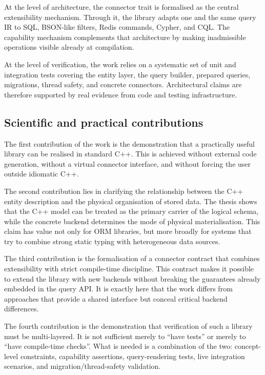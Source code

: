 At the level of architecture, the connector trait is formalised as the central extensibility mechanism. Through it, the library adapts one and the same query IR to SQL, BSON-like filters, Redis commands, Cypher, and CQL. The capability mechanism complements that architecture by making inadmissible operations visible already at compilation.

At the level of verification, the work relies on a systematic set of unit and integration tests covering the entity layer, the query builder, prepared queries, migrations, thread safety, and concrete connectors. Architectural claims are therefore supported by real evidence from code and testing infrastructure.

\subsection{Scientific and practical contributions}

The first contribution of the work is the demonstration that a practically useful \ORMName{} library can be realised in standard C++. This is achieved without external code generation, without a virtual connector interface, and without forcing the user outside idiomatic C++.

The second contribution lies in clarifying the relationship between the C++ entity description and the physical organisation of stored data. The thesis shows that the C++ model can be treated as the primary carrier of the logical schema, while the concrete backend determines the mode of physical materialisation. This claim has value not only for ORM libraries, but more broadly for systems that try to combine strong static typing with heterogeneous data sources.

The third contribution is the formalisation of a connector contract that combines extensibility with strict compile-time discipline. This contract makes it possible to extend the library with new backends without breaking the guarantees already embedded in the query API. It is exactly here that the work differs from approaches that provide a shared interface but conceal critical backend differences.

The fourth contribution is the demonstration that verification of such a library must be multi-layered. It is not sufficient merely to ``have tests'' or merely to ``have compile-time checks''. What is needed is a combination of the two: concept-level constraints, capability assertions, query-rendering tests, live integration scenarios, and migration/thread-safety validation.

